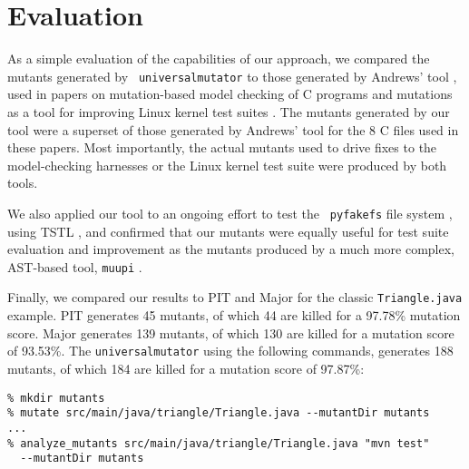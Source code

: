 \section{Evaluation}

As a simple evaluation of the capabilities of our approach, we compared the mutants generated by {\tt
  universalmutator} to those generated by Andrews' tool \cite{mutant},
used in papers on mutation-based model checking of C programs
\cite{ASE15} and mutations as a tool for improving Linux kernel test
suites \cite{mutation17}.  The mutants generated by our tool were a
superset of those generated by Andrews' tool for the 8 C files used in
these papers.  Most importantly, the actual mutants used to drive
fixes to the model-checking harnesses or the Linux kernel test suite
were produced by both tools.

We also applied our tool to an ongoing effort to test the {\tt
  pyfakefs} file system \cite{pyfakefs}, using TSTL \cite{nfm15,tstlsttt},
and confirmed that our mutants were equally useful for test suite
evaluation and improvement as the mutants produced by a much more
complex, AST-based tool, {\tt muupi} \cite{muupi}.

Finally, we compared our results to PIT \cite{pittest} and Major
\cite{major} for the classic {\tt Triangle.java} example.  PIT
generates 45 mutants, of which 44 are killed for a 97.78\% mutation
score.  Major generates 139 mutants, of which 130 are killed for a
mutation score of 93.53\%.  The {\tt universalmutator} using the
following commands, generates 188 mutants, of which 184 are killed for
a mutation score of 97.87\%:

{\scriptsize
\begin{verbatim}
% mkdir mutants
% mutate src/main/java/triangle/Triangle.java --mutantDir mutants
...
% analyze_mutants src/main/java/triangle/Triangle.java "mvn test"
  --mutantDir mutants
\end{verbatim}
}